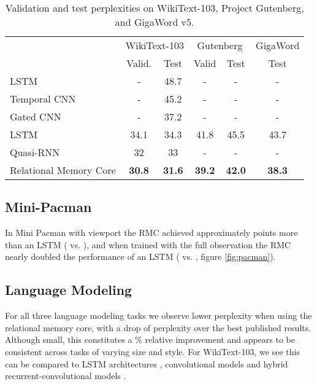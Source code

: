 \documentclass{article}
\begin{document}
\begin{table}[h!]
    \centering
    \caption{Validation and test perplexities on WikiText-103, Project Gutenberg, and GigaWord v5.}
    \begin{tabular}{lccccc}
    \toprule
    \multicolumn{1}{c}{} & \multicolumn{2}{c}{WikiText-103} & \multicolumn{2}{c}{Gutenberg} & \multicolumn{1}{c}{GigaWord}\\
    & Valid. & Test & Valid & Test & Test \\
    \midrule
    LSTM \cite{grave2016improving} & - & 48.7 & - & - & - \\
    Temporal CNN \cite{bai2018convolutional} & - & 45.2 & - & - & - \\
    Gated CNN \cite{dauphin2016language} & - & 37.2 & - & - & - \\ 
    LSTM \cite{rae2018fast} & 34.1 & 34.3 &  41.8 & 45.5 & 43.7\\
    Quasi-RNN \cite{merity2018scalable} & 32 & 33 & - & - & -  \\
    \midrule
    Relational Memory Core & \textbf{30.8} & \textbf{31.6} & \textbf{39.2} & \textbf{42.0}  & \textbf{38.3} \\
    \bottomrule
    \end{tabular}
    \label{tab:wiki}
\end{table}

\subsection{Mini-Pacman}
In Mini Pacman with viewport the RMC achieved approximately  points more than an LSTM ( vs. ), and when trained with the full observation the RMC nearly doubled the performance of an LSTM ( vs. , figure \ref{fig:pacman}).


\subsection{Language Modeling}
For all three language modeling tasks we observe lower perplexity when using the relational memory core, with a drop of  perplexity over the best published results. Although small, this constitutes a \% relative improvement and appears to be consistent across tasks of varying size and style. For WikiText-103, we see this can be compared to LSTM architectures \citep{graves2016hybrid, rae2018fast}, convolutional models \citep{dauphin2016language} and hybrid recurrent-convolutional models \citep{merity2018scalable}.
\end{document}
